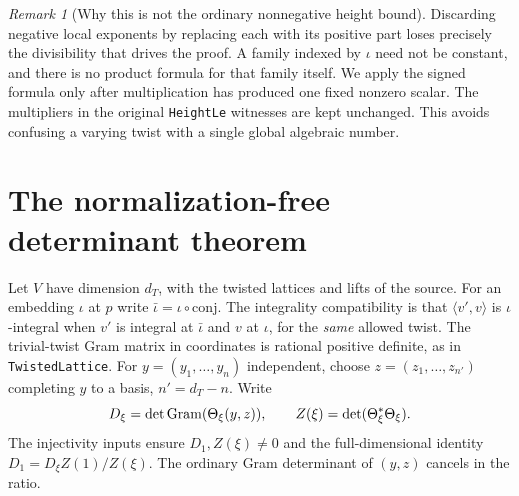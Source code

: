 \documentclass[11pt,letterpaper]{article}
\theoremstyle{remark}\newtheorem{remark}[theorem]{Remark}
\begin{document}
\begin{remark}[Why this is not the ordinary nonnegative height bound]
Discarding negative local exponents by replacing each with its positive part loses precisely the divisibility that drives the proof. A family indexed by $\iota$ need not be constant, and there is no product formula for that family itself. We apply the signed formula only after multiplication has produced one fixed nonzero scalar. The multipliers in the original \texttt{HeightLe} witnesses are kept unchanged. This avoids confusing a varying twist with a single global algebraic number.
\end{remark}

\section{The normalization-free determinant theorem}\label{sec:det}
Let $V$ have dimension $d_T$, with the twisted lattices and lifts of the source. For an embedding $\iota$ at $p$ write $\bar\iota=\iota\circ\mathrm{conj}$. The integrality compatibility is that $\langle v',v\rangle$ is $\iota$-integral when $v'$ is integral at $\bar\iota$ and $v$ at $\iota$, for the \emph{same} allowed twist. The trivial-twist Gram matrix in coordinates is rational positive definite, as in \texttt{TwistedLattice}. For $y=(y_1,\ldots,y_n)$ independent, choose $z=(z_1,\ldots,z_{n'})$ completing $y$ to a basis, $n'=d_T-n$. Write
\[
 D_\xi=\det\operatorname{Gram}(\Theta_\xi(y,z)),\qquad Z(\xi)=\det(\Theta_\xi^*\Theta_\xi).
\]
The injectivity inputs ensure $D_1,Z(\xi)\ne0$ and the full-dimensional identity $D_1=D_\xi Z(1)/Z(\xi)$. The ordinary Gram determinant of $(y,z)$ cancels in the ratio.
\end{document}

